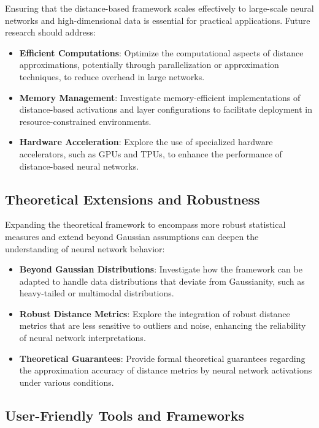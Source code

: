Ensuring that the distance-based framework scales effectively to large-scale neural networks and high-dimensional data is essential for practical applications. Future research should address:
\begin{itemize}
    \item \textbf{Efficient Computations}: Optimize the computational aspects of distance approximations, potentially through parallelization or approximation techniques, to reduce overhead in large networks.
    \item \textbf{Memory Management}: Investigate memory-efficient implementations of distance-based activations and layer configurations to facilitate deployment in resource-constrained environments.
    \item \textbf{Hardware Acceleration}: Explore the use of specialized hardware accelerators, such as GPUs and TPUs, to enhance the performance of distance-based neural networks.
\end{itemize}

\subsection{Theoretical Extensions and Robustness}

Expanding the theoretical framework to encompass more robust statistical measures and extend beyond Gaussian assumptions can deepen the understanding of neural network behavior:
\begin{itemize}
    \item \textbf{Beyond Gaussian Distributions}: Investigate how the framework can be adapted to handle data distributions that deviate from Gaussianity, such as heavy-tailed or multimodal distributions.
    \item \textbf{Robust Distance Metrics}: Explore the integration of robust distance metrics that are less sensitive to outliers and noise, enhancing the reliability of neural network interpretations.
    \item \textbf{Theoretical Guarantees}: Provide formal theoretical guarantees regarding the approximation accuracy of distance metrics by neural network activations under various conditions.
\end{itemize}

\subsection{User-Friendly Tools and Frameworks}

